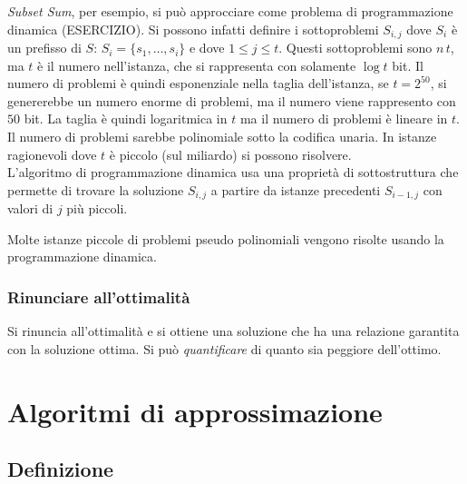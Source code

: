 \emph{Subset Sum}, per esempio, si può approcciare come problema di programmazione dinamica (ESERCIZIO).
Si
possono infatti definire 
i sottoproblemi $S_{i, j}$ dove $S_i$ è un prefisso di $S$: $ S_i = \{ s_1, \dots, s_i \} $
e dove $1 \leq j \leq t$.
Questi sottoproblemi sono
$n \, t$, ma $t$ è il numero nell'istanza,
che si rappresenta con solamente $\log t$ bit.
Il numero di problemi è quindi esponenziale nella taglia dell'istanza, se $t = 2^{50}$, si genererebbe un numero enorme di problemi, ma il numero viene rappresento con $50$ bit.
La taglia è quindi logaritmica in $t$ ma il numero di problemi è lineare in $t$.
Il numero di problemi sarebbe polinomiale sotto la codifica unaria.
In istanze ragionevoli dove $t$ è piccolo (sul miliardo) si possono risolvere.
\\
L'algoritmo di programmazione dinamica usa una proprietà di sottostruttura che permette di trovare la soluzione $S_{i,j}$ a partire da istanze precedenti $S_{i-1,j}$ con valori di $j$ più piccoli.

Molte istanze piccole di problemi pseudo polinomiali vengono risolte usando la programmazione dinamica.

\subsubsection{Rinunciare all'ottimalità}

Si rinuncia all'ottimalità e si ottiene una soluzione che ha una relazione garantita con la soluzione ottima. Si può \emph{quantificare} di quanto sia peggiore dell'ottimo.

\section{Algoritmi di approssimazione}

\subsection{Definizione}

